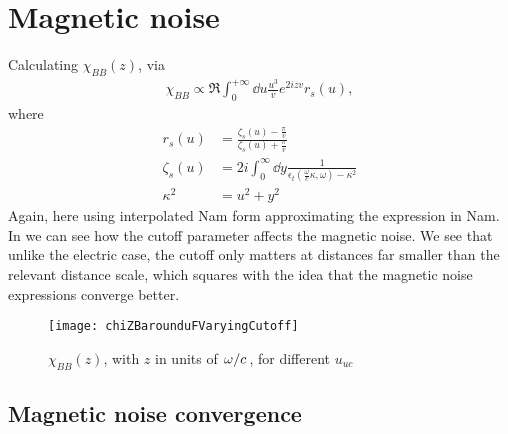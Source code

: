 \documentclass[11pt]{article}
\begin{document}
	\graphicspath{{figures/}}

	\section{Magnetic noise} \label{sec:intro}

	Calculating $\chi_{BB}(z)$, via
	\begin{align}
		\chi_{BB} \propto \Re \int_0^{+\infty} \dd{u} \frac{u^3}{v} e^{2 i z v} r_s(u),
	\end{align}
	where
	\begin{align}
		r_s(u) &= \frac{\zeta_s(u) - \frac{\pi}{v}}{\zeta_s(u) + \frac{\pi}{v}} \\
		\zeta_s(u) &= 2i \int_0^\infty \dd{y} \frac{1}{\epsilon_t(\frac{\omega}{c}\kappa, \omega) - \kappa^2} \\
		\kappa^2 &= u^2 + y^2
	\end{align}
	Again, here using interpolated Nam form approximating the expression in Nam\supercite{Nam1967}.
	In  we can see how the cutoff parameter affects the magnetic noise.
	We see that unlike the electric case, the cutoff only matters at distances far smaller than the relevant distance scale, which squares with the idea that the magnetic noise expressions converge better.
	\begin{figure}[htp]
		\centering
		\texttt{[image: chiZBarounduFVaryingCutoff]}
		\caption{$\chi_{BB}(z)$, with $z$ in units of $\flatfrac{\omega}{c}$, for different $u_{uc}$} \label{fig:cutoff}
	\end{figure}

	\subsection{Magnetic noise convergence} \label{subsec:magneticnoiseconvergence}
\end{document}
